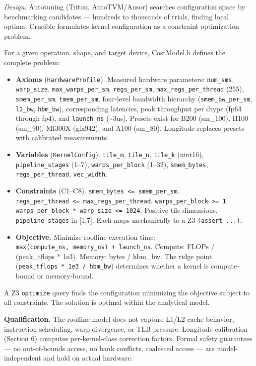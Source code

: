 \emph{Design.} Autotuning (Triton, AutoTVM/Ansor) searches configuration space by benchmarking candidates --- hundreds to thousands of trials, finding local optima. Crucible formulates kernel configuration as a constraint optimization problem.

For a given operation, shape, and target device, CostModel.h defines the complete problem:

\begin{itemize}
\tightlist
\item
  \textbf{Axioms} (\texttt{HardwareProfile}). Measured hardware parameters: \texttt{num\_sms}, \texttt{warp\_size}, \texttt{max\_warps\_per\_sm}, \texttt{regs\_per\_sm}, \texttt{max\_regs\_per\_thread} (255), \texttt{smem\_per\_sm}, \texttt{tmem\_per\_sm}, four-level bandwidth hierarchy (\texttt{smem\_bw\_per\_sm}, \texttt{l2\_bw}, \texttt{hbm\_bw}), corresponding latencies, peak throughput per dtype (fp64 through fp4), and \texttt{launch\_ns} (\textasciitilde3us). Presets exist for B200 (sm\_100), H100 (sm\_90), MI300X (gfx942), and A100 (sm\_80). Longitude replaces presets with calibrated measurements.
\item
  \textbf{Variables} (\texttt{KernelConfig}). \texttt{tile\_m}, \texttt{tile\_n}, \texttt{tile\_k} (uint16), \texttt{pipeline\_stages} (1--7), \texttt{warps\_per\_block} (1--32), \texttt{smem\_bytes}, \texttt{regs\_per\_thread}, \texttt{vec\_width}.
\item
  \textbf{Constraints} (C1--C8). \texttt{smem\_bytes\ \textless{}=\ smem\_per\_sm}. \texttt{regs\_per\_thread\ \textless{}=\ max\_regs\_per\_thread}. \texttt{warps\_per\_block\ \textgreater{}=\ 1}. \texttt{warps\_per\_block\ *\ warp\_size\ \textless{}=\ 1024}. Positive tile dimensions. \texttt{pipeline\_stages} in {[}1,7{]}. Each maps mechanically to a Z3 \texttt{(assert\ ...)}.
\item
  \textbf{Objective.} Minimize roofline execution time: \texttt{max(compute\_ns,\ memory\_ns)\ +\ launch\_ns}. Compute: FLOPs / (peak\_tflops * 1e3). Memory: bytes / hbm\_bw. The ridge point (\texttt{peak\_tflops\ *\ 1e3\ /\ hbm\_bw}) determines whether a kernel is compute-bound or memory-bound.
\end{itemize}

A Z3 \texttt{optimize} query finds the configuration minimizing the objective subject to all constraints. The solution is optimal within the analytical model.

\textbf{Qualification.} The roofline model does not capture L1/L2 cache behavior, instruction scheduling, warp divergence, or TLB pressure. Longitude calibration (Section 6) computes per-kernel-class correction factors. Formal safety guarantees --- no out-of-bounds access, no bank conflicts, coalesced access --- are model-independent and hold on actual hardware.

